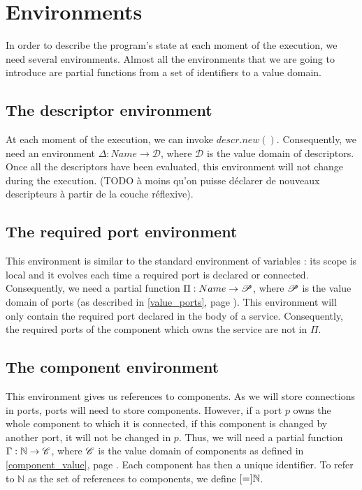 \section{Environments}
In order to describe the program's state at each moment of the execution, we need several environments. Almost all the environments that we are going to introduce are partial functions from a set of identifiers to a value domain.

\subsection{The descriptor environment}
At each moment of the execution, we can invoke $descr.new()$. Consequently, we need an environment  $\Delta : Name \rightarrow \mathcal{D}$, where $\mathcal{D}$ is the value domain of descriptors. Once all the descriptors have been evaluated, this environment will not change during the execution.
 (TODO à moins qu'on puisse déclarer de nouveaux descripteurs à partir de la couche réflexive).

\subsection{The required port environment}
This environment is similar to the standard environment of variables : its scope is local and it evolves each time a required port is declared or connected. Consequently, we need a partial function $\Pi : Name \rightarrow \mathcal{P}$, where $\mathcal{P}$ is the value domain of ports (as described in \ref{value_ports}, page \pageref{value_ports}). This environment will only contain the required port declared in the body of a service. Consequently, the required ports of the component which owns the service are not in $\Pi$.


\subsection{The component environment}
This environment gives us references to components. As we will store connections in ports, ports will need to store components. However, if a port $p$ owns the whole component to which it is connected, if this component is changed by another port, it will not be changed in $p$. Thus, we will need a partial function $\Gamma : \mathbb{N} \rightarrow \mathcal{C}$, where $\mathcal{C}$ is the value domain of components as defined in \ref{component_value}, page \pageref{component_value}. Each component has then a unique identifier. To refer to $\mathbb{N}$ as the set of references to components, we define $\Cref = \mathbb{N}$.

